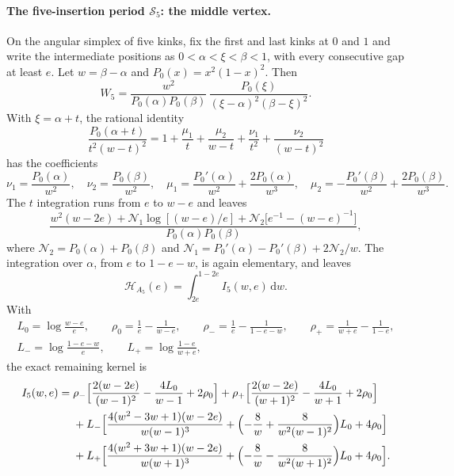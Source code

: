 \documentclass[11pt,a4paper]{article}
\numberwithin{equation}{section}
\newcommand{\dd}{\,\mathrm d}
\begin{document}
\paragraph{The five-insertion period $\mathcal S_5$: the middle vertex.} On the angular simplex of five kinks, fix the
first and last kinks at $0$ and $1$ and write the intermediate positions as $0<\alpha<\xi<\beta<1$, with every
consecutive gap at least $e$. Let $w=\beta-\alpha$ and $P_0(x)=x^2(1-x)^2$. Then
\begin{equation}
 W_5=\frac{w^2}{P_0(\alpha)P_0(\beta)}\,\frac{P_0(\xi)}{(\xi-\alpha)^2(\beta-\xi)^2}.
\end{equation}
With $\xi=\alpha+t$, the rational identity
\begin{equation}
 \frac{P_0(\alpha+t)}{t^2(w-t)^2}=1+\frac{\mu_1}{t}+\frac{\mu_2}{w-t}+\frac{\nu_1}{t^2}+\frac{\nu_2}{(w-t)^2}
\end{equation}
has the coefficients
\begin{equation}
 \nu_1=\frac{P_0(\alpha)}{w^2},\quad \nu_2=\frac{P_0(\beta)}{w^2},\quad
 \mu_1=\frac{P_0'(\alpha)}{w^2}+\frac{2P_0(\alpha)}{w^3},\quad
 \mu_2=-\frac{P_0'(\beta)}{w^2}+\frac{2P_0(\beta)}{w^3}.
\end{equation}
The $t$ integration runs from $e$ to $w-e$ and leaves
\begin{equation}
 \frac{w^2(w-2e)+\mathcal N_1\log[(w-e)/e]+\mathcal N_2\bigl[e^{-1}-(w-e)^{-1}\bigr]}{P_0(\alpha)P_0(\beta)},
 \label{eq:dualB:postcentral}
\end{equation}
where $\mathcal N_2=P_0(\alpha)+P_0(\beta)$ and $\mathcal N_1=P_0'(\alpha)-P_0'(\beta)+2\mathcal N_2/w$. The
integration over $\alpha$, from $e$ to $1-e-w$, is again elementary, and leaves
\begin{equation}
 \mathcal H_{A_5}(e)=\int_{2e}^{1-2e}I_5(w,e)\dd w.
\end{equation}
With
\begin{equation}
\begin{gathered}
 L_0=\log\frac{w-e}{e},\qquad \rho_0=\frac1e-\frac1{w-e},\qquad
 \rho_-=\frac1e-\frac1{1-e-w},\qquad \rho_+=\frac1{w+e}-\frac1{1-e},\\
 L_-=\log\frac{1-e-w}{e},\qquad L_+=\log\frac{1-e}{w+e},
\end{gathered}
\end{equation}
the exact remaining kernel is
\begin{equation}
\begin{aligned}
 I_5(w,e)={}&\rho_-\Bigl[\frac{2(w-2e)}{(w-1)^2}-\frac{4L_0}{w-1}+2\rho_0\Bigr]
 +\rho_+\Bigl[\frac{2(w-2e)}{(w+1)^2}-\frac{4L_0}{w+1}+2\rho_0\Bigr]\\
 &+L_-\Bigl[\frac{4(w^2-3w+1)(w-2e)}{w(w-1)^3}+\Bigl(-\frac8w+\frac8{w^2(w-1)^2}\Bigr)L_0+4\rho_0\Bigr]\\
 &+L_+\Bigl[\frac{4(w^2+3w+1)(w-2e)}{w(w+1)^3}+\Bigl(-\frac8w-\frac8{w^2(w+1)^2}\Bigr)L_0+4\rho_0\Bigr].
\end{aligned}
\label{eq:dualB:I5}
\end{equation}
\end{document}
